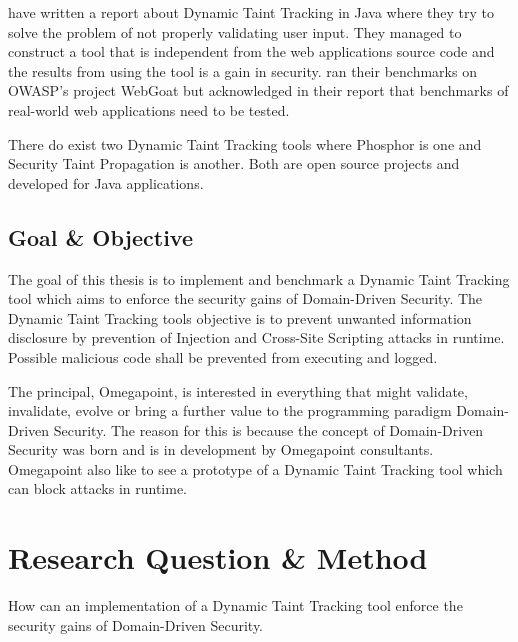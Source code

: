 \documentclass{../kththesis}
\begin{document}
	\textcite{Haldar} have written a report about Dynamic Taint Tracking in Java where they try to solve the problem of not properly validating user input. They managed to construct a tool that is independent from the web applications source code and the results from using the tool is a gain in security. \textcite{Haldar} ran their benchmarks on OWASP’s project WebGoat \parencite{webgoat} but acknowledged in their report that benchmarks of real-world web applications need to be tested.
	
	There do exist two Dynamic Taint Tracking tools where Phosphor \parencite{phosphor} is one and Security Taint Propagation \parencite{securityTaint} is another. Both are open source projects and developed for Java applications.
	
	
	\section{Goal \& Objective}
	The goal of this thesis is to implement and benchmark a Dynamic Taint Tracking tool which aims to enforce the security gains of Domain-Driven Security. The Dynamic Taint Tracking tools objective is to prevent unwanted information disclosure by prevention of Injection and Cross-Site Scripting attacks in runtime. Possible malicious code shall be prevented from executing and logged.
	
	The principal, Omegapoint, is interested in everything that might validate, invalidate, evolve or bring a further value to the programming paradigm Domain-Driven Security. The reason for this is because the concept of Domain-Driven Security was born and is in development by Omegapoint consultants. Omegapoint also like to see a prototype of a Dynamic Taint Tracking tool which can block attacks in runtime.
	
	
	
	\chapter{Research Question \& Method} \label{ResearchQuestionMethod}
	\begin{chapquote}{}
		How can an implementation of a Dynamic Taint Tracking tool enforce the security gains of Domain-Driven Security.
	\end{chapquote}
	
\end{document}

